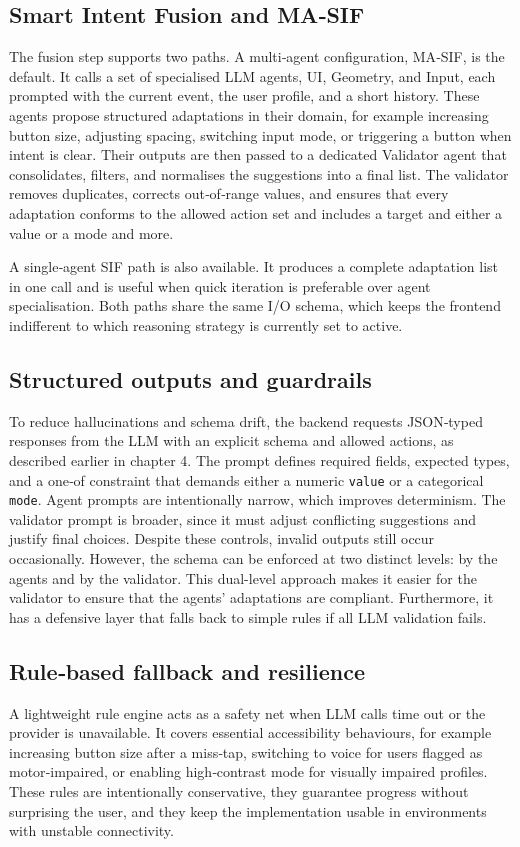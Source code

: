 \documentclass[openany]{book}
\begin{document}
\subsection{Smart Intent Fusion and MA‑SIF}
The fusion step supports two paths. A multi‑agent configuration, MA‑SIF, is the default. It calls a set of specialised LLM agents, UI, Geometry, and Input, each prompted with the current event, the user profile, and a short history. These agents propose structured adaptations in their domain, for example increasing button size, adjusting spacing, switching input mode, or triggering a button when intent is clear. Their outputs are then passed to a dedicated Validator agent that consolidates, filters, and normalises the suggestions into a final list. The validator removes duplicates, corrects out‑of‑range values, and ensures that every adaptation conforms to the allowed action set and includes a target and either a value or a mode and more.

A single‑agent SIF path is also available. It produces a complete adaptation list in one call and is useful when quick iteration is preferable over agent specialisation. Both paths share the same I/O schema, which keeps the frontend indifferent to which reasoning strategy is currently set to active.

\subsection{Structured outputs and guardrails}
To reduce hallucinations and schema drift, the backend requests JSON‑typed responses from the LLM with an explicit schema and allowed actions, as described earlier in chapter 4. The prompt defines required fields, expected types, and a one‑of constraint that demands either a numeric \texttt{value} or a categorical \texttt{mode}. Agent prompts are intentionally narrow, which improves determinism. The validator prompt is broader, since it must adjust conflicting suggestions and justify final choices. Despite these controls, invalid outputs still occur occasionally. However, the schema can be enforced at two distinct levels: by the agents and by the validator. This dual-level approach makes it easier for the validator to ensure that the agents' adaptations are compliant. Furthermore, it has a defensive layer that falls back to simple rules if all LLM validation fails.

\subsection{Rule‑based fallback and resilience}
A lightweight rule engine acts as a safety net when LLM calls time out or the provider is unavailable. It covers essential accessibility behaviours, for example increasing button size after a miss‑tap, switching to voice for users flagged as motor‑impaired, or enabling high‑contrast mode for visually impaired profiles. These rules are intentionally conservative, they guarantee progress without surprising the user, and they keep the implementation usable in environments with unstable connectivity.
\end{document}
